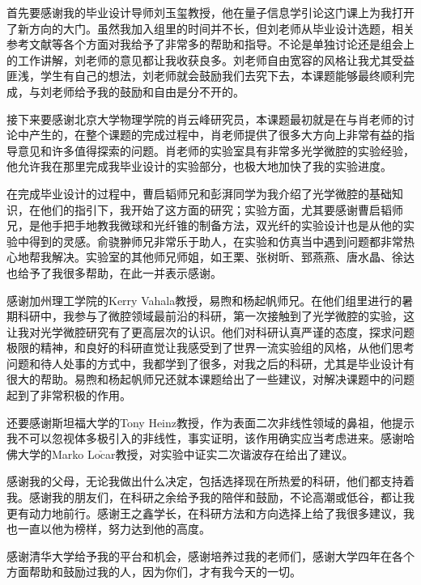 \begin{acknowledgement}
首先要感谢我的毕业设计导师刘玉玺教授，他在量子信息学引论这门课上为我打开了新方向的大门。虽然我加入组里的时间并不长，但刘老师从毕业设计选题，相关参考文献等各个方面对我给予了非常多的帮助和指导。不论是单独讨论还是组会上的工作讲解，刘老师的意见都让我收获良多。刘老师自由宽容的风格让我尤其受益匪浅，学生有自己的想法，刘老师就会鼓励我们去究下去，本课题能够最终顺利完成，与刘老师给予我的鼓励和自由是分不开的。

接下来要感谢北京大学物理学院的肖云峰研究员，本课题最初就是在与肖老师的讨论中产生的，在整个课题的完成过程中，肖老师提供了很多大方向上非常有益的指导意见和许多值得探索的问题。肖老师的实验室具有非常多光学微腔的实验经验，他允许我在那里完成我毕业设计的实验部分，也极大地加快了我的实验进度。

在完成毕业设计的过程中，曹启韬师兄和彭湃同学为我介绍了光学微腔的基础知识，在他们的指引下，我开始了这方面的研究；实验方面，尤其要感谢曹启韬师兄，是他手把手地教我微球和光纤锥的制备方法，双光纤的实验设计也是从他的实验中得到的灵感。俞骁翀师兄非常乐于助人，在实验和仿真当中遇到问题都非常热心地帮我解决。实验室的其他师兄师姐，如王栗、张树昕、郅燕燕、唐水晶、徐达也给予了我很多帮助，在此一并表示感谢。

感谢加州理工学院的Kerry Vahala教授，易煦和杨起帆师兄。在他们组里进行的暑期科研中，我参与了微腔领域最前沿的科研，第一次接触到了光学微腔的实验，这让我对光学微腔研究有了更高层次的认识。他们对科研认真严谨的态度，探求问题极限的精神，和良好的科研直觉让我感受到了世界一流实验组的风格，从他们思考问题和待人处事的方式中，我都学到了很多，对我之后的科研，尤其是毕业设计有很大的帮助。易煦和杨起帆师兄还就本课题给出了一些建议，对解决课题中的问题起到了非常积极的作用。

还要感谢斯坦福大学的Tony Heinz教授，作为表面二次非线性领域的鼻祖，他提示我不可以忽视体多极引入的非线性，事实证明，该作用确实应当考虑进来。感谢哈佛大学的Marko Lo$\mathrm{\check{c}}$ar教授，对实验中证实二次谐波存在给出了建议。

感谢我的父母，无论我做出什么决定，包括选择现在所热爱的科研，他们都支持着我。感谢我的朋友们，在科研之余给予我的陪伴和鼓励，不论高潮或低谷，都让我更有动力地前行。感谢王之鑫学长，在科研方法和方向选择上给了我很多建议，我也一直以他为榜样，努力达到他的高度。

感谢清华大学给予我的平台和机会，感谢培养过我的老师们，感谢大学四年在各个方面帮助和鼓励过我的人，因为你们，才有我今天的一切。
\end{acknowledgement}
